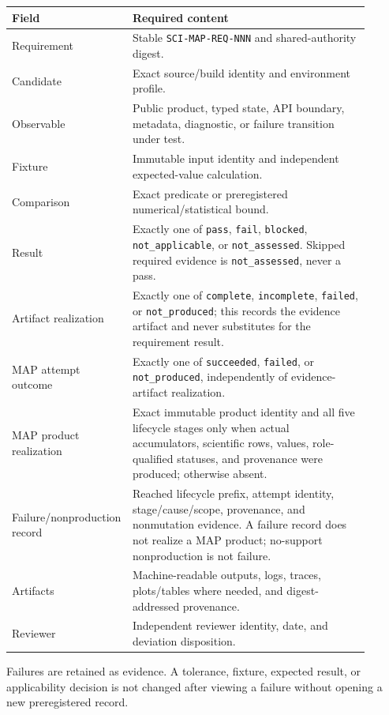 \documentclass[10pt]{article}
\begin{document}
\begin{longtable}{L{0.24\linewidth}L{0.66\linewidth}}
\toprule
Field & Required content\\
\midrule
Requirement & Stable \texttt{SCI-MAP-REQ-NNN} and shared-authority digest.\\
Candidate & Exact source/build identity and environment profile.\\
Observable & Public product, typed state, API boundary, metadata, diagnostic,
or failure transition under test.\\
Fixture & Immutable input identity and independent expected-value calculation.\\
Comparison & Exact predicate or preregistered numerical/statistical bound.\\
Result & Exactly one of \texttt{pass}, \texttt{fail}, \texttt{blocked},
\texttt{not\_applicable}, or \texttt{not\_assessed}. Skipped required evidence
is \texttt{not\_assessed}, never a pass.\\
Artifact realization & Exactly one of \texttt{complete},
\texttt{incomplete}, \texttt{failed}, or \texttt{not\_produced}; this records
the evidence artifact and never substitutes for the requirement result.\\
MAP attempt outcome & Exactly one of \texttt{succeeded}, \texttt{failed}, or
\texttt{not\_produced}, independently of evidence-artifact realization.\\
MAP product realization & Exact immutable product identity and all five
lifecycle stages only when actual accumulators, scientific rows, values,
role-qualified statuses, and provenance were produced; otherwise absent.\\
Failure/nonproduction record & Reached lifecycle prefix, attempt identity,
stage/cause/scope, provenance, and nonmutation evidence. A failure record does
not realize a MAP product; no-support nonproduction is not failure.\\
Artifacts & Machine-readable outputs, logs, traces, plots/tables where needed,
and digest-addressed provenance.\\
Reviewer & Independent reviewer identity, date, and deviation disposition.\\
\bottomrule
\end{longtable}

\SCIMapRequirementResultDefinition

Failures are retained as evidence. A tolerance, fixture, expected result, or
applicability decision is not changed after viewing a failure without opening
a new preregistered record.
\end{document}
